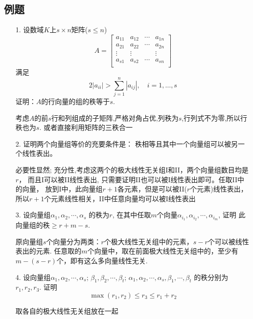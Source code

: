 \subsection*{例题}
\begin{itemize}
	\item[1.] 设数域$K$上$s\times n$矩阵($s\le n$)
	\begin{equation}
	\nonumber
	A = \begin{bmatrix}
		a_{11} & a_{12} & \cdots & a_{1n}\\
		a_{21} & a_{22} & \cdots & a_{2n}\\
		\vdots & \vdots &        & \vdots\\
		a_{s1} & a_{s2} & \cdots & a_{sn}\\
	\end{bmatrix}
	\end{equation}
	满足
	$$2 | a_{ii} | > \sum_{j=1}^n |a_{ij}|, \quad i=1,\dots, s$$
	证明：$A$的行向量的组的秩等于$s$.
	\begin{solution}
	考虑$A$的前$s$行和列组成的子矩阵,严格对角占优,列秩为$s$,行列式不为零,所以行秩也为$s$.
	或者直接利用矩阵的三秩合一
	\end{solution}
	\vspace{2cm}

    \item[2.] 证明两个向量组等价的充要条件是：
	          秩相等且其中一个向量组可以被另一个线性表出。 
	\begin{solution}
	必要性显然; 充分性,考虑这两个的极大线性无关组I和II，两个向量组数目均是$r$，
	而且I可以被II线性表出, 只需要证明II也可以被I线性表出即可。任取II中的向量，
	放到I中，此向量组$r+1$各元素，但是可以被II($r$个元素)线性表出，
	所以$r+1$个元素线性相关，II中任意向量均可以被I线性表出
	\end{solution}
	\vspace{2cm}

	\item[3.] 设向量组$\alpha_1, \alpha_2, \cdots, \alpha_s$ 的秩为$r$,
	在其中任取$m$个向量$\alpha_{i_1}, \alpha_{i_2}, \cdots, \alpha_{i_m}$, 证明 
	此向量组的秩$\ge r+m-s$.
	\begin{solution}
	原向量组$s$个向量分为两类：$r$个极大线性无关组中的元素，$s-r$个可以被线性表出的元素.
	任意取的$m$个向量中，取在前面极大线性无关组中的，至少有$m-(s-r)$个，即有这么多向量线性无关.
	\end{solution}
	\vspace{2cm}

	\item[4.] 设向量组$\alpha_1, \alpha_2, \cdots, \alpha_s$;
	                 $\beta_1, \beta_2, \cdots, \beta_t$; 
					 $\alpha_1, \alpha_2, \cdots, \alpha_s, \beta_1, \cdots, \beta_t$
	的秩分别为$r_1, r_2, r_3$. 证明$$\max(r_1, r_2) \le r_3 \le r_1 + r_2$$
	\begin{solution}
	取各自的极大线性无关组放在一起
	\end{solution}
	\vspace{1.5cm}
\end{itemize}

